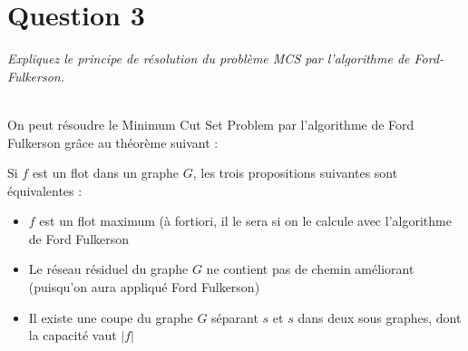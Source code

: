 \section{Question 3}
\textit{Expliquez le principe de résolution du problème MCS par l'algorithme de Ford-Fulkerson.}\\~\\\par
On peut résoudre le Minimum Cut Set Problem par l'algorithme de Ford Fulkerson grâce au théorème suivant :\\\par
Si $f$ est un flot dans un graphe $G$, les trois propositions suivantes sont équivalentes :\\
\begin{itemize}
 \item $f$ est un flot maximum (à fortiori, il le sera si on le calcule avec l'algorithme de Ford Fulkerson
 \item Le réseau résiduel du graphe $G$ ne contient pas de chemin améliorant (puisqu'on aura appliqué Ford Fulkerson)
 \item Il existe une coupe du graphe $G$ séparant $s$ et $s$ dans deux sous graphes, dont la capacité vaut $|f|$
\end{itemize}

